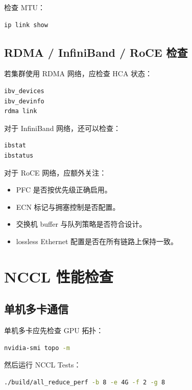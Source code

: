 检查 MTU：

\begin{lstlisting}[language=bash,caption={MTU 检查},label={lst:mtu-check}]
ip link show
\end{lstlisting}

\subsection{RDMA / InfiniBand / RoCE 检查}

若集群使用 RDMA 网络，应检查 HCA 状态：

\begin{lstlisting}[language=bash,caption={RDMA 设备检查},label={lst:rdma-device-check}]
ibv_devices
ibv_devinfo
rdma link
\end{lstlisting}

对于 InfiniBand 网络，还可以检查：

\begin{lstlisting}[language=bash,caption={InfiniBand 状态检查},label={lst:ib-check}]
ibstat
ibstatus
\end{lstlisting}

对于 RoCE 网络，应额外关注：

\begin{itemize}
\item PFC 是否按优先级正确启用。
\item ECN 标记与拥塞控制是否配置。
\item 交换机 buffer 与队列策略是否符合设计。
\item lossless Ethernet 配置是否在所有链路上保持一致。
\end{itemize}

\section{NCCL 性能检查}

\subsection{单机多卡通信}

单机多卡应先检查 GPU 拓扑：

\begin{lstlisting}[language=bash,caption={单机 GPU 拓扑检查},label={lst:single-node-topo-check}]
nvidia-smi topo -m
\end{lstlisting}

然后运行 NCCL Tests：

\begin{lstlisting}[language=bash,caption={单机 NCCL all_reduce 测试},label={lst:single-node-nccl-test}]
./build/all_reduce_perf -b 8 -e 4G -f 2 -g 8
\end{lstlisting}

